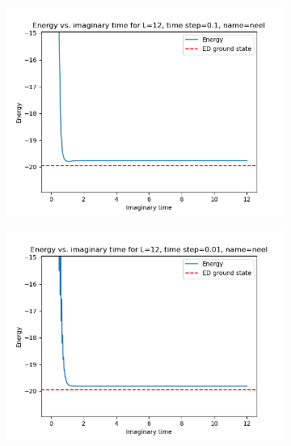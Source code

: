 \documentclass[12pt]{article}
\begin{document}
\begin{figure}
\begin{subfigure}{.5\textwidth}
  \centering
  \includegraphics[width=\linewidth]{p4_1_energy_L_12time_step_0.1name_neel.png}
  \label{fig:2a}
\end{subfigure}
\begin{subfigure}{.5\textwidth}
  \centering
  \includegraphics[width=\linewidth]{p4_1_energy_L_12time_step_0.01name_neel.png}
  \label{fig:2b}
\end{subfigure}
\begin{subfigure}{.5\textwidth}
  \centering

\end{subfigure}
\end{figure}
\end{document}
